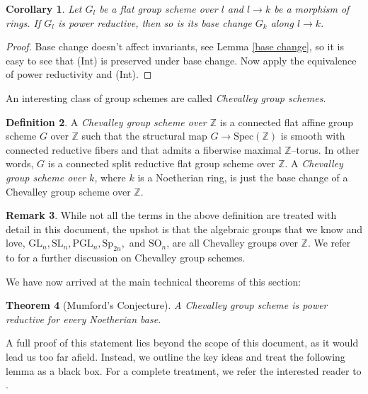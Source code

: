 \documentclass{article}
\theoremstyle{plain}
\newtheorem{Th}{Theorem}[section]
\newtheorem{Cor}[Th]{Corollary}
\theoremstyle{definition}
\newtheorem{Def}[Th]{Definition}
\newtheorem{Rem}[Th]{Remark}
\begin{document}
\begin{Cor}
   Let $G_l$ be a flat group scheme over $l$ and  $l\to k$ be a morphism of rings. If $G_l$ is power reductive, then so is  
   its  base change $G_k$ along $l\to k$. 
\end{Cor}

\begin{proof}
    Base change doesn't affect invariants, see Lemma \ref{base change}, so it is easy to see that (Int) is preserved under base change. Now apply the equivalence of power reductivity and (Int).
\end{proof}

An interesting class of group schemes are called \textit{Chevalley group schemes}.

\begin{Def}
    A \textit{Chevalley group scheme over $\mathbb{Z}$} is a connected flat affine group scheme $G$ over $\mathbb Z$ such that the structural map $G\to \mathrm{Spec}(\mathbb Z)$ is smooth with connected reductive fibers and that admits a fiberwise maximal $\mathbb Z$--torus. In other words, $G$  is a connected split reductive flat group scheme over $\mathbb{Z}$. A \textit{Chevalley group scheme over $k$}, where $k$ is a Noetherian ring, is just the base change of a Chevalley group scheme over $\mathbb{Z}$.
\end{Def}

\begin{Rem}
    While  not all the terms in the above definition are treated with detail in this document, the upshot is that the algebraic groups that we know and love, $\text{GL}_n, \text{SL}_n, \text{PGL}_n, \text{Sp}_{2n}, $ and $\text{SO}_n$, are all Chevalley groups over $\mathbb{Z}$. We refer to \cite[Section 1]{ConradNonsplit} for a further discussion on Chevalley group schemes. 
\end{Rem}

 We have now arrived at the main technical theorems of this section: 

\begin{Th}[{Mumford's Conjecture}]\label{Mumfords Conjecture}
A Chevalley group scheme is power reductive for every Noetherian base.
\end{Th}


A full proof of this statement lies beyond the scope of this document, as it would lead us too far afield. Instead, we outline the key ideas and treat the following lemma as a black box. For a complete treatment, we refer the interested reader to \cite[Section 3]{FvdK10}. 
\end{document}
